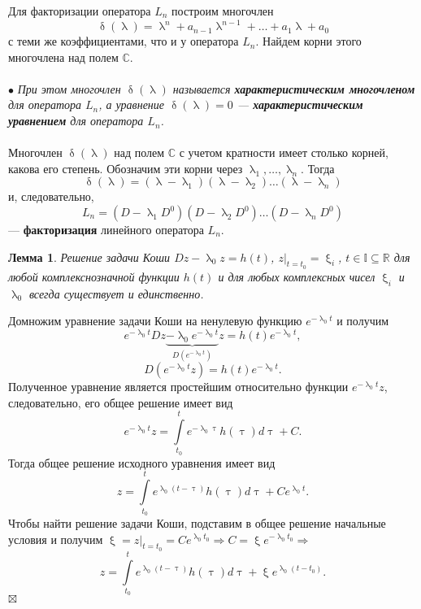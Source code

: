 \documentclass[a4paper, 12pt]{report}
\newenvironment{Proof} %
{\par\noindent{$\blacklozenge$}} %
{\hfill$\scriptstyle\boxtimes$}
\renewcommand{\delta}{\updelta}
\renewcommand{\lambda}{\uplambda}
\renewcommand{\xi}{\upxi}
\begin{document}
	Для факторизации оператора $L_n$ построим многочлен $$\delta(\lambda) = \lambda^n+a_{n-1}\lambda^{n-1} + \ldots + a_1\lambda + a_0$$ с теми же коэффициентами, что и у оператора $L_n$. Найдем корни этого многочлена над полем $\mathbb{C}$.\\\\
	$\bullet$ \textit{При этом многочлен $\delta(\lambda)$ называется \textbf{характеристическим многочленом} для оператора $L_n$, а уравнение $\delta(\lambda) = 0$ --- \textbf{характеристическим уравнением} для оператора $L_n$.}\\\\
	Многочлен $\delta(\lambda)$ над полем $\mathbb{C}$ с учетом кратности имеет столько корней, какова его степень. Обозначим эти корни через $\lambda_1,\ldots, \lambda_n$. Тогда $$\delta(\lambda) = (\lambda - \lambda_1)(\lambda-\lambda_2)\ldots(\lambda - \lambda_n)$$ и, следовательно, $$L_n = (D-\lambda_1D^0)(D-\lambda_2D^0)\ldots(D-\lambda_nD^0)$$ --- \textbf{факторизация} линейного оператора $L_n$.
	\newtheorem*{2_1_1}{Лемма}\begin{2_1_1}Решение задачи Коши $Dz - \lambda_0z = h(t)$, $z|_{t=t_0} = \xi_i$, $t\in\mathbb{I}\subseteq\mathbb{R}$ для любой комплекснозначной функции $h(t)$ и для любых комплексных чисел $\xi_i$ и $\lambda_0$ всегда существует и единственно.
	\end{2_1_1}\begin{Proof}
		Домножим уравнение задачи Коши на ненулевую функцию $e^{-\lambda_0t}$ и получим $$e^{-\lambda_0t}Dz \underbrace{ - \lambda_0 e^{-\lambda_0t}}_{D(e^{-\lambda_0t})}z = h(t) e^{-\lambda_0t},$$
		$$D(e^{-\lambda_0t}z)=h(t)e^{-\lambda_0t}.$$ Полученное уравнение является простейшим относительно функции $e^{-\lambda_0t}z$, следовательно, его общее решение имеет вид $$e^{-\lambda_0t}z = \int\limits_{t_0}^te^{-\lambda_0\uptau}h(\uptau)d\uptau + C.$$ Тогда общее решение исходного уравнения имеет вид $$z = \int\limits_{t_0}^te^{\lambda_0(t-\uptau)}h(\uptau)d\uptau + Ce^{\lambda_0t}.$$ Чтобы найти решение задачи Коши, подставим в общее решение начальные условия и получим $\xi = z|_{t=t_0} = Ce^{\lambda_0t_0}\Rightarrow C = \xi e^{-\lambda_0t_0}\Rightarrow$ $$z = \int\limits_{t_0}^te^{\lambda_0(t-\uptau)}h(\uptau)d\uptau + \xi e^{\lambda_0(t-t_0)}.$$
	\end{Proof}
\end{document}
